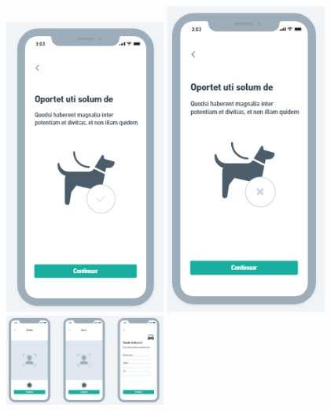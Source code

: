 \begin{center}
\\
\includegraphics[width=200]{exemplos/Wireframe/Wireframe9.PNG}
\includegraphics[width=200]{exemplos/Wireframe/Wireframe10.PNG}
\includegraphics[width=200]{exemplos/Wireframe/Wireframe11.PNG}

\end{center}

